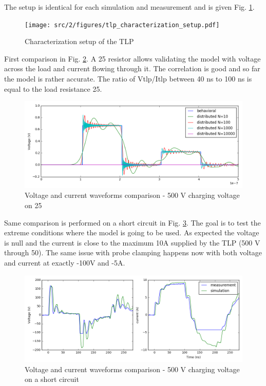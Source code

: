 The setup is identical for each simulation and measurement and is given Fig. \ref{fig:setup-cz-tlp-model}.

\begin{figure}[!h]
  \centering
  \texttt{[image: src/2/figures/tlp\_characterization\_setup.pdf]}
  \caption{Characterization setup of the TLP}
  \label{fig:setup-cz-tlp-model}
\end{figure}

First comparison in Fig. \ref{fig:comparison-tlp-load}.
A 25\textOmega{} resistor allows validating the model with voltage across the load and current flowing through it.
The correlation is good and so far the model is rather accurate.
The ratio of Vtlp/Itlp between 40 ns to 100 ns is equal to the load resistance 25\textOmega{}.

\begin{figure}[!h]
  \centering
  \includegraphics[width=\textwidth]{src/2/figures/tlp_comparison_R25_500V.png}
  \caption{Voltage and current waveforms comparison - 500 V charging voltage on 25\textOmega{}}
  \label{fig:comparison-tlp-load}
\end{figure}

Same comparison is performed on a short circuit in Fig. \ref{fig:comparison-tlp-short}.
The goal is to test the extreme conditions where the model is going to be used.
As expected the voltage is null and the current is close to the maximum 10A supplied by the TLP (500 V through 50\textOmega{}).
The same issue with probe clamping happens now with both voltage and current at exactly -100V and -5A.

\begin{figure}[!h]
  \centering
  \includegraphics[width=\textwidth]{src/2/figures/tlp_comparison_short_500V.png}
  \caption{Voltage and current waveforms comparison - 500 V charging voltage on a short circuit}
  \label{fig:comparison-tlp-short}
\end{figure}


